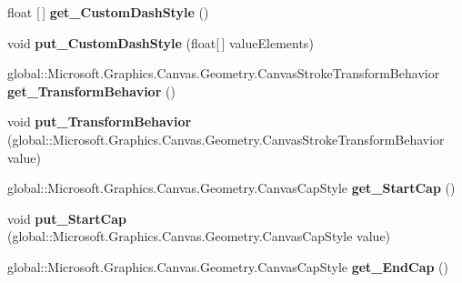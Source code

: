 \begin{DoxyCompactItemize}
float \mbox{[}$\,$\mbox{]} {\bfseries get\+\_\+\+Custom\+Dash\+Style} ()
\item 
\mbox{\label{interface_microsoft_1_1_graphics_1_1_canvas_1_1_geometry_1_1_i_canvas_stroke_style_afc2f9171bd8e3a6ef7927abcbd756c59}} 
void {\bfseries put\+\_\+\+Custom\+Dash\+Style} (float\mbox{[}$\,$\mbox{]} value\+Elements)
\item 
\mbox{\label{interface_microsoft_1_1_graphics_1_1_canvas_1_1_geometry_1_1_i_canvas_stroke_style_a8c19df45244410757192563987bfbdfa}} 
global\+::\+Microsoft.\+Graphics.\+Canvas.\+Geometry.\+Canvas\+Stroke\+Transform\+Behavior {\bfseries get\+\_\+\+Transform\+Behavior} ()
\item 
\mbox{\label{interface_microsoft_1_1_graphics_1_1_canvas_1_1_geometry_1_1_i_canvas_stroke_style_ac482e23f3ef5eebc025715899d1deb51}} 
void {\bfseries put\+\_\+\+Transform\+Behavior} (global\+::\+Microsoft.\+Graphics.\+Canvas.\+Geometry.\+Canvas\+Stroke\+Transform\+Behavior value)
\item 
\mbox{\label{interface_microsoft_1_1_graphics_1_1_canvas_1_1_geometry_1_1_i_canvas_stroke_style_a23f30b5c717e10b15ce38fa7d3721e03}} 
global\+::\+Microsoft.\+Graphics.\+Canvas.\+Geometry.\+Canvas\+Cap\+Style {\bfseries get\+\_\+\+Start\+Cap} ()
\item 
\mbox{\label{interface_microsoft_1_1_graphics_1_1_canvas_1_1_geometry_1_1_i_canvas_stroke_style_a2fdd3aee781a3fb799081a2ec567b732}} 
void {\bfseries put\+\_\+\+Start\+Cap} (global\+::\+Microsoft.\+Graphics.\+Canvas.\+Geometry.\+Canvas\+Cap\+Style value)
\item 
\mbox{\label{interface_microsoft_1_1_graphics_1_1_canvas_1_1_geometry_1_1_i_canvas_stroke_style_aab45339696dfcadb0ae0eb8e89bb68e4}} 
global\+::\+Microsoft.\+Graphics.\+Canvas.\+Geometry.\+Canvas\+Cap\+Style {\bfseries get\+\_\+\+End\+Cap} ()

\end{DoxyCompactItemize}
